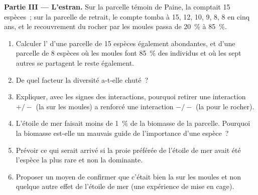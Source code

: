 \begin{problem}
\medskip
\noindent\textbf{Partie III --- L'estran.}
Sur la parcelle témoin de Paine, la  comptait 15 espèces~; sur
la parcelle de retrait, le compte tomba à 15, 12, 10, 9, 8, 8 en cinq
ans, et le recouvrement du rocher par les moules passa de \qty{20}{\%}
à \qty{85}{\%}.
\begin{enumerate}[resume]
  \item Calculer l' d'une parcelle de 15 espèces
        également abondantes, et d'une parcelle de 8 espèces où les
        moules font \qty{85}{\%} des individus et où les sept autres se
        partagent le reste également.
  \item De quel facteur la diversité a-t-elle chuté~?
  \item Expliquer, avec les signes des interactions, pourquoi retirer
        une interaction $+/-$ (la  sur les moules) a renforcé
        une interaction $-/-$ (la  pour le rocher).
  \item L'étoile de mer faisait moins de \qty{1}{\%} de la biomasse de
        la parcelle. Pourquoi la biomasse est-elle un mauvais guide de
        l'importance d'une espèce~?
  \item Prévoir ce qui serait arrivé si la proie préférée de l'étoile
        de mer avait été l'espèce la plus rare et non la dominante.
  \item Proposer un moyen de confirmer que c'était bien la 
        sur les moules et non quelque autre effet de l'étoile de mer
        (une expérience de mise en cage).
\end{enumerate}


\end{problem}
